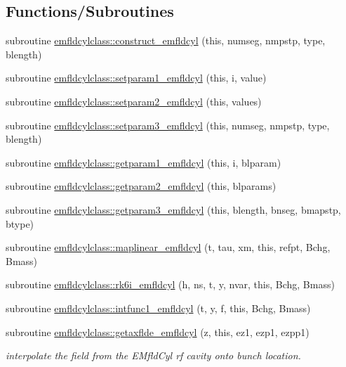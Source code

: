 \subsection*{Functions/\+Subroutines}
\begin{DoxyCompactItemize}
\item 
subroutine \mbox{\hyperlink{namespaceemfldcylclass_a70ad259f3db6c392c07a4fa46cb7461b}{emfldcylclass\+::construct\+\_\+emfldcyl}} (this, numseg, nmpstp, type, blength)
\item 
subroutine \mbox{\hyperlink{namespaceemfldcylclass_a8d9d8db5c093803ef59ad5bc4873e745}{emfldcylclass\+::setparam1\+\_\+emfldcyl}} (this, i, value)
\item 
subroutine \mbox{\hyperlink{namespaceemfldcylclass_a5ea9bb43c35afba9da054ba9d06a691c}{emfldcylclass\+::setparam2\+\_\+emfldcyl}} (this, values)
\item 
subroutine \mbox{\hyperlink{namespaceemfldcylclass_a9d9de556d5c18607ebed47a0615fdd44}{emfldcylclass\+::setparam3\+\_\+emfldcyl}} (this, numseg, nmpstp, type, blength)
\item 
subroutine \mbox{\hyperlink{namespaceemfldcylclass_af1fa0868ef29363ce860ff3d67cb49ed}{emfldcylclass\+::getparam1\+\_\+emfldcyl}} (this, i, blparam)
\item 
subroutine \mbox{\hyperlink{namespaceemfldcylclass_a691ed53cff8adba275fc7b782c9065b8}{emfldcylclass\+::getparam2\+\_\+emfldcyl}} (this, blparams)
\item 
subroutine \mbox{\hyperlink{namespaceemfldcylclass_adf4df0b6ae1ec53f13894e1bdfe962ae}{emfldcylclass\+::getparam3\+\_\+emfldcyl}} (this, blength, bnseg, bmapstp, btype)
\item 
subroutine \mbox{\hyperlink{namespaceemfldcylclass_a6ecff12cc9860de4f3ec126083db6fea}{emfldcylclass\+::maplinear\+\_\+emfldcyl}} (t, tau, xm, this, refpt, Bchg, Bmass)
\item 
subroutine \mbox{\hyperlink{namespaceemfldcylclass_a9bd0c565261b617a6860bb5ae288b486}{emfldcylclass\+::rk6i\+\_\+emfldcyl}} (h, ns, t, y, nvar, this, Bchg, Bmass)
\item 
subroutine \mbox{\hyperlink{namespaceemfldcylclass_ae4610622d1f42f54717c97aab5324391}{emfldcylclass\+::intfunc1\+\_\+emfldcyl}} (t, y, f, this, Bchg, Bmass)
\item 
subroutine \mbox{\hyperlink{namespaceemfldcylclass_ad20d4f71c528ba16303a936f78d0c44e}{emfldcylclass\+::getaxflde\+\_\+emfldcyl}} (z, this, ez1, ezp1, ezpp1)
\begin{DoxyCompactList}\small\item\em interpolate the field from the E\+Mfld\+Cyl rf cavity onto bunch location. \end{DoxyCompactList}\item 

\end{DoxyCompactItemize}
